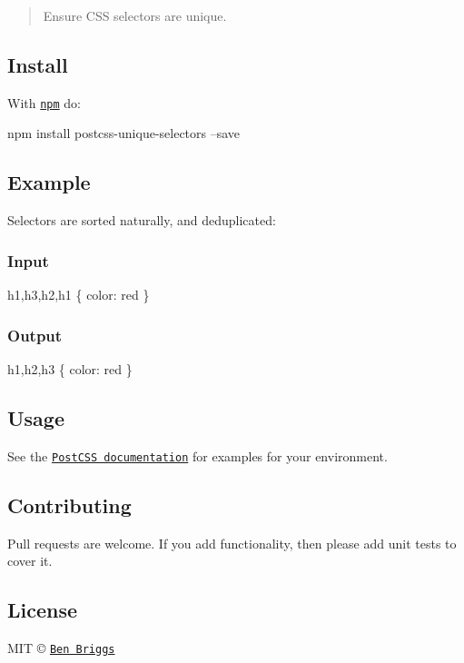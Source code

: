\begin{quote}
Ensure C\+SS selectors are unique. \end{quote}


\subsection*{Install}

With \href{https://npmjs.org/package/postcss-unique-selectors}{\tt npm} do\+:


\begin{DoxyCode}
npm install postcss-unique-selectors --save
\end{DoxyCode}


\subsection*{Example}

Selectors are sorted naturally, and deduplicated\+:

\subsubsection*{Input}


\begin{DoxyCode}
h1,h3,h2,h1 \{
    color: red
\}
\end{DoxyCode}


\subsubsection*{Output}


\begin{DoxyCode}
h1,h2,h3 \{
    color: red
\}
\end{DoxyCode}


\subsection*{Usage}

See the \href{https://github.com/postcss/postcss#usage}{\tt Post\+C\+SS documentation} for examples for your environment.

\subsection*{Contributing}

Pull requests are welcome. If you add functionality, then please add unit tests to cover it.

\subsection*{License}

M\+IT © \href{http://beneb.info}{\tt Ben Briggs} 